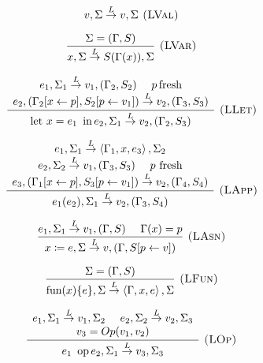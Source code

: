 \documentclass[english]{llncs}
\begin{document}
\begin{figure}[!t]
{\footnotesize{}}%
\begin{minipage}[t]{0.59\columnwidth}%
{\footnotesize{}
\[
v,\Sigma\overset{L}{\rightarrow}v,\Sigma\textsc{ (LVal)}
\]
}{\footnotesize \par}

{\footnotesize{}
\[
\frac{\Sigma=(\Gamma,S)}{x,\Sigma\overset{L}{\rightarrow}S(\Gamma(x)),\Sigma}\textsc{ (LVar)}
\]
}{\footnotesize \par}

{\footnotesize{}
\[
\frac{\begin{array}[t]{c}
e_{1},\Sigma_{1}\overset{L}{\rightarrow}v_{1},(\Gamma_{2},S_{2})\,\,\,\,\,\,\,\, p\,\mbox{fresh}\\
e_{2},(\Gamma_{2}[x\leftarrow p],S_{2}[p\leftarrow v_{1}])\overset{L}{\rightarrow}v_{2},(\Gamma_{3},S_{3})
\end{array}}{\mbox{let \ensuremath{x=e_{1}}\,\ in\,\ensuremath{e_{2}}},\Sigma_{1}\overset{L}{\rightarrow}v_{2},(\Gamma_{2},S_{3})}\textsc{ (LLet)}
\]
}{\footnotesize \par}

{\footnotesize{}
\[
\frac{\begin{array}[t]{c}
e_{1},\Sigma_{1}\overset{L}{\rightarrow}\left\langle \Gamma_{1},x,e_{3}\right\rangle ,\Sigma_{2}\\
e_{2},\Sigma_{2}\overset{L}{\rightarrow}v_{1},(\Gamma_{3},S_{3})\,\,\,\,\,\,\,\,\mbox{\ensuremath{p}\ fresh}\\
e_{3},(\Gamma_{1}[x\leftarrow p],S_{3}[p\leftarrow v_{1}])\overset{L}{\rightarrow}v_{2},(\Gamma_{4},S_{4})
\end{array}}{e_{1}(e_{2}),\Sigma_{1}\overset{L}{\rightarrow}v_{2},(\Gamma_{3},S_{4})}\textsc{ (LApp)}
\]
}{\footnotesize \par}

{\footnotesize{}
\[
\frac{e_{1},\Sigma_{1}\overset{L}{\rightarrow}v_{1},(\Gamma,S)\,\,\,\,\,\,\,\,\Gamma(x)=p}{x\coloneqq e,\Sigma\overset{L}{\rightarrow}v,(\Gamma,S[p\leftarrow v])}\textsc{ (LAsn)}
\]
}{\footnotesize \par}

{\footnotesize{}
\[
\frac{\Sigma=(\Gamma,S)}{\mbox{fun(\ensuremath{x})\{\ensuremath{e}\}},\Sigma\overset{L}{\rightarrow}\left\langle \Gamma,x,e\right\rangle ,\Sigma}\textsc{ (LFun)}
\]
}{\footnotesize \par}

{\footnotesize{}
\[
\frac{\begin{array}[t]{c}
e_{1},\Sigma_{1}\overset{L}{\rightarrow}v_{1},\Sigma_{2}\,\,\,\,\,\,\,\, e_{2},\Sigma_{2}\overset{L}{\rightarrow}v_{2},\Sigma_{3}\\
v_{3}=Op(v_{1},v_{2})
\end{array}}{e_{1}\mbox{\, op\,}e_{2},\Sigma_{1}\overset{L}{\rightarrow}v_{3},\Sigma_{3}}\textsc{ (LOp)}
\]
}{\footnotesize \par}


\end{minipage}
\end{figure}
\end{document}
